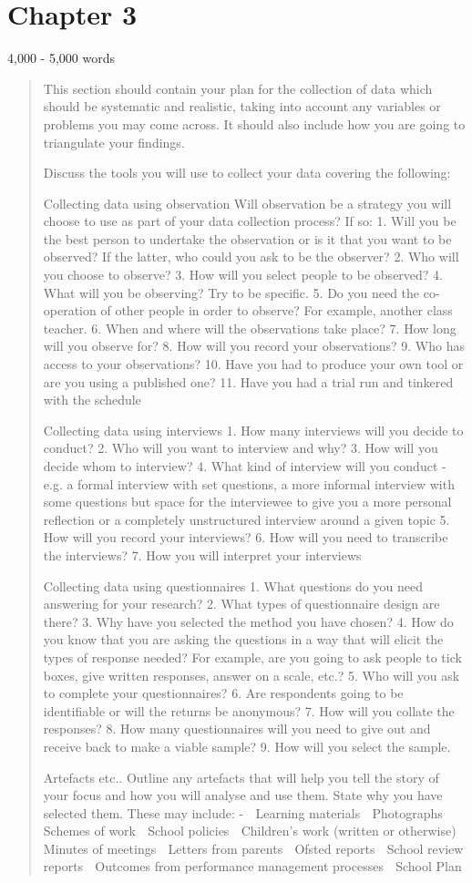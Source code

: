 \section{Chapter 3}
4,000 - 5,000 words
\begin{quote}
This section should contain your plan for the collection of data which should be systematic and realistic, taking into account any variables or problems you may come across. It should also include how you are going to triangulate your findings.

Discuss the tools you will use to collect your data covering the following:

Collecting data using observation
Will observation be a strategy you will choose to use as part of your data collection process?
If so:
1.	Will you be the best person to undertake the observation or is it that you want to be observed?  If the latter, who could you ask to be the observer?
2.	Who will you choose to observe?
3.	How will you select people to be observed?
4.	What will you be observing?  Try to be specific.
5.	Do you need the co-operation of other people in order to observe?  For example, another class teacher.
6.	When and where will the observations take place?
7.	How long will you observe for?
8.	How will you record your observations?
9.	Who has access to your observations?
10.	Have you had to produce your own tool or are you using a published one?
11.	Have you had a trial run and tinkered with the schedule

Collecting data using interviews
1.	How many interviews will you decide to conduct?
2.	Who will you want to interview and why?
3.	How will you decide whom to interview?
4.	What kind of interview will you conduct - e.g. a formal interview with set questions, a more informal interview with some questions but space for the interviewee to give you a more personal reflection or a completely unstructured interview around a given topic
5.	How will you record your interviews?
6.	How will you need to transcribe the interviews?
7.	How you will interpret your interviews
	
Collecting data using questionnaires
1.	What questions do you need answering for your research?
2.	What types of questionnaire design are there?
3.	Why have you selected the method you have chosen?
4.	How do you know that you are asking the questions in a way that will elicit the types of response needed?  For example, are you going to ask people to tick boxes, give written responses, answer on a scale, etc.?
5.	Who will you ask to complete your questionnaires?
6.	Are respondents going to be identifiable or will the returns be anonymous?
7.	How will you collate the responses?
8.	How many questionnaires will you need to give out and receive back to make a viable sample?
9.	How will you select the sample.


Artefacts etc..
Outline any artefacts that will help you tell the story of your focus and how you will analyse and use them. State why you have selected them. These may include: -
	Learning materials
	Photographs
	Schemes of work
	School policies
	Children's work (written or otherwise)
	Minutes of meetings
	Letters from parents
	Ofsted reports
	School review reports
	Outcomes from performance management processes
	School Plan
\end{quote}